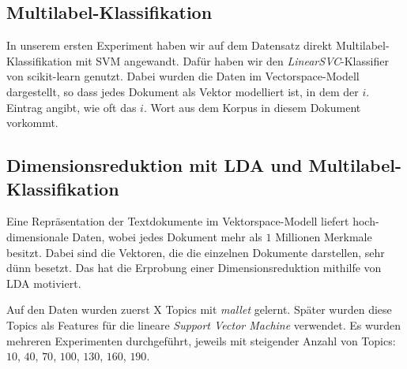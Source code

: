 
\subsection{Multilabel-Klassifikation}

In unserem ersten Experiment haben wir auf dem Datensatz direkt Multilabel-Klassifikation mit SVM angewandt.
Dafür haben wir den \emph{LinearSVC}-Klassifier von scikit-learn genutzt.
Dabei wurden die Daten im Vectorspace-Modell dargestellt, so dass jedes Dokument als Vektor modelliert ist, in dem der $i$. Eintrag angibt, wie oft das $i$. Wort aus dem Korpus in diesem Dokument vorkommt.


\subsection{Dimensionsreduktion mit LDA und Multilabel-Klassifikation}

Eine Repräsentation der Textdokumente im Vektorspace-Modell liefert hoch-dimensionale Daten, wobei jedes Dokument mehr als $1$ Millionen Merkmale besitzt.
Dabei sind die Vektoren, die die einzelnen Dokumente darstellen, sehr dünn besetzt.
Das hat die Erprobung einer Dimensionsreduktion mithilfe von LDA motiviert.

Auf den Daten wurden zuerst X Topics mit \emph{mallet} \cite{McCallumMALLET} gelernt.
Später wurden diese Topics als Features für die lineare \emph{Support Vector Machine} verwendet.
Es wurden mehreren Experimenten durchgeführt, jeweils mit steigender Anzahl von Topics: $10$, $40$, $70$, $100$, $130$, $160$, $190$.





